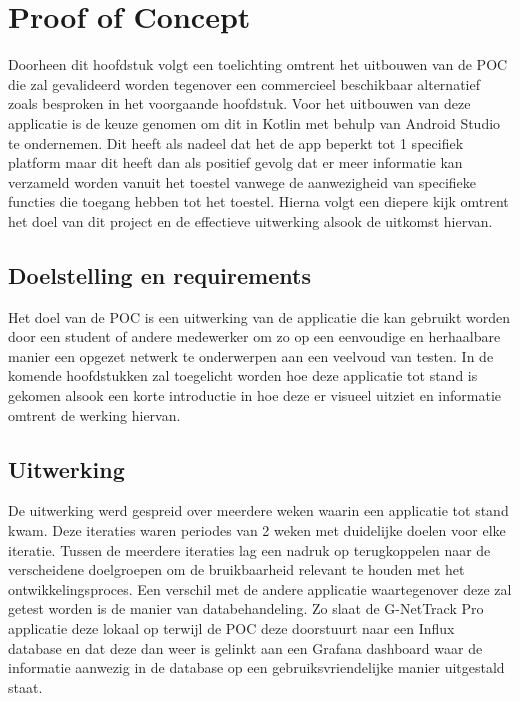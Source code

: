 \chapter{Proof of Concept}%
\label{ch:proofofconcept}

Doorheen dit hoofdstuk volgt een toelichting omtrent het uitbouwen van de POC die zal gevalideerd worden tegenover een commercieel beschikbaar alternatief zoals besproken in het voorgaande hoofdstuk. Voor het uitbouwen van deze applicatie is de keuze genomen om dit in Kotlin met behulp van Android Studio te ondernemen. Dit heeft als nadeel dat het de app beperkt tot 1 specifiek platform maar dit heeft dan als positief gevolg dat er meer informatie kan verzameld worden vanuit het toestel vanwege de aanwezigheid van specifieke functies die toegang hebben tot het toestel. Hierna volgt een diepere kijk omtrent het doel van dit project en de effectieve uitwerking alsook de uitkomst hiervan. 

\section{Doelstelling en requirements}

Het doel van de POC is een uitwerking van de applicatie die kan gebruikt worden door een student of andere medewerker om zo op een eenvoudige en herhaalbare manier een opgezet netwerk te onderwerpen aan een veelvoud van testen. In de komende hoofdstukken zal toegelicht worden hoe deze applicatie tot stand is gekomen alsook een korte introductie in hoe deze er visueel uitziet en informatie omtrent de werking hiervan. 

\section{Uitwerking}

De uitwerking werd gespreid over meerdere weken waarin een applicatie tot stand kwam. Deze iteraties waren periodes van 2 weken met duidelijke doelen voor elke iteratie. Tussen de meerdere iteraties lag een nadruk op terugkoppelen naar de verscheidene doelgroepen om de bruikbaarheid relevant te houden met het ontwikkelingsproces. Een verschil met de andere applicatie waartegenover deze zal getest worden is de manier van databehandeling. Zo slaat de G-NetTrack Pro applicatie deze lokaal op terwijl de POC deze doorstuurt naar een Influx database en dat deze dan weer is gelinkt aan een Grafana dashboard waar de informatie aanwezig in de database op een gebruiksvriendelijke manier uitgestald staat. 

